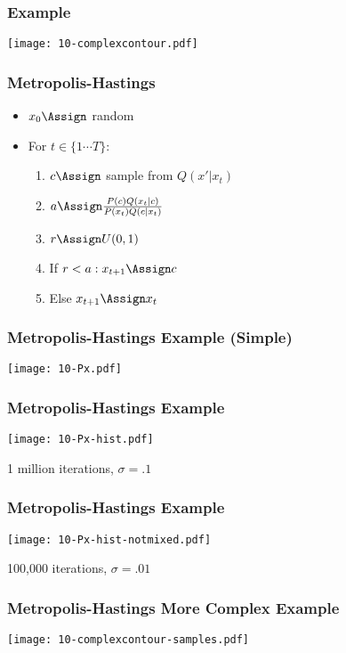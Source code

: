 \begin{frame}[fragile]
\frametitle{Example}

\centering
\texttt{[image: 10-complexcontour.pdf]}

\end{frame}

\begin{frame}[fragile]
\frametitle{Metropolis-Hastings}
\begin{itemize}
\item $x_0 \Assign $ random
\item For $t \in \{ 1 \cdots T \}$:
\begin{enumerate}
\item $c \Assign $ sample from $Q(x' | x_t)$
\item $a \Assign \frac{P(c)Q(x_t|c)}{P(x_t)Q(c|x_t)}$
\item $r \Assign U(0,1)$
\item If $r < a: x_{t+1} \Assign c$
\item Else $x_{t+1} \Assign x_t$
\end{enumerate}
\end{itemize}
\end{frame}

\begin{frame}[fragile]
\frametitle{Metropolis-Hastings Example (Simple)}

\centering
\texttt{[image: 10-Px.pdf]}

\end{frame}

\begin{frame}[fragile]
\frametitle{Metropolis-Hastings Example}

\centering
\texttt{[image: 10-Px-hist.pdf]}

1 million iterations, $\sigma = .1$

\end{frame}

\begin{frame}[fragile]
\frametitle{Metropolis-Hastings Example}

\centering
\texttt{[image: 10-Px-hist-notmixed.pdf]}

100,000 iterations, $\sigma = .01$

\end{frame}

\begin{frame}[fragile]
\frametitle{Metropolis-Hastings More Complex Example}

\centering
\texttt{[image: 10-complexcontour-samples.pdf]}

\end{frame}

